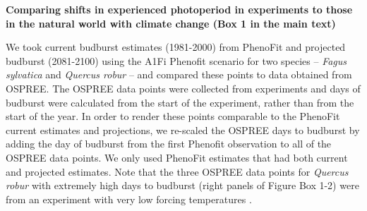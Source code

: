 \documentclass{article}
\begin{document}
\par \textbf{Comparing shifts in experienced photoperiod in experiments to those in the natural world with climate change (Box 1 in the main text)}
\par We took current budburst estimates (1981-2000) from PhenoFit \citep{duputie2015} and projected budburst (2081-2100) using the A1Fi Phenofit scenario for two species -- \textit{Fagus sylvatica} and \textit{Quercus robur} -- and compared these points to data obtained from OSPREE. The OSPREE data points were collected from experiments and days of budburst were calculated from the start of the experiment, rather than from the start of the year. In order to render these points comparable to the PhenoFit current estimates and projections, we re-scaled the OSPREE days to budburst by adding the day of budburst from the first Phenofit observation to all of the OSPREE data points. We only used PhenoFit estimates that had both current and projected estimates. Note that the three OSPREE data points for \textit{Quercus robur} with extremely high days to budburst (right panels of Figure Box 1-2) were from an experiment with very low forcing temperatures \citep[][3.8-5.7$^{\circ}$]{Morin:2010aa}. 


\clearpage
\end{document}
